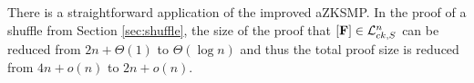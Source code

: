 There is a straightforward application of the improved aZKSMP. In the proof of a shuffle from Section \ref{sec:shuffle}, the size of the proof that $[\mathbf{{F}}]\in\mathcal{L}_{ck,S}^n$ can be reduced from $2n+\Theta(1)$ to $\Theta(\log n)$ and thus the total proof size is reduced from $4n+o(n)$ to $2n+o(n)$.


